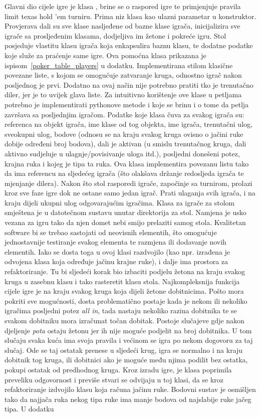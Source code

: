 Glavni dio cijele igre je klasa , brine se o raspored igre te primjenjuje pravila limit texas hold 'em turniru. Prima niz klasa kao ulazni parametar u konstruktor. Provjerava dali su sve klase nasljeđene od bazne klase igrača, inicijalizira sve igrače sa prosljeđenim klasama, dodjeljiva im žetone i pokreće igru. Stol posjeduje vlastitu klasu igrača koja enkapsulira baznu klasu, te dodatne podatke koje služe za praćenje same igre. Ova pomoćna klasa prikazana je ispisom~\ref{poker_table_players} u dodatku. Implementirana stilom klasične povezane liste, s kojom se omogućuje zatvaranje kruga, odnostno igrač nakon posljednog je prvi. Dodatno na ovaj način nije potrebno pratiti tko je trenutačno diler, jer je to uvijek glava liste. Za intuitivno korištenje ove klase u petljama potrebno je implementirati pythonove metode  i  koje se brinu i o tome da petlja završava sa posljednjim igračom. Podatke koje klasa čuva za svakog igrača su: referenca na objekt igrača, ime klase od tog objekta, ime igrača, trenutačni ulog, sveokupni ulog, bodove (odnosu se na kraju svakog kruga ovisno o jačini ruke dobije određeni broj bodova), dali je aktivan (u smislu trenutačnog kruga, dali aktivno sudjeluje u ulagnje/povisivanje uloga itd.), posljedni donešeni potez, krajna ruka i kojeg je tipa ta ruka. Ova klasa implementira povezanu listu tako da ima referencu na sljedećeg igrača (što olakšava držanje redosljeda igrača te mjenjanje dilera). Nakon što stol rasporedi igrače, započinje sa turnirom, prolazi kroz sve faze igre dok ne ostane samo jedan igrač. Prati ulaganja svih igrača, i na kraju dijeli ukupni ulog odgovarajućim igračima. Klasa za igrače za stolom smještena je u datotečnom sustavu unutar direktorija za stol. Namjena je usko vezana za igru tako da njen domet nebi smijo prelaziti samog stola. Kvalitetan software bi se trebao sastojati od neovisnih elementih, što omogućuje jednostavnije testiranje svakog elementa te razmjena ili dodavanje novih elementih. Iako se dosta toga u ovoj klasi razdvojilo (kao npr. izrađena je odvojena klasa koja određuje jačinu krajne ruke), i dalje ima prostora za refaktoriranje. Tu bi sljedeći korak bio izbaciti podjelu žetona na kraju svakog kruga u zasebnu klasu i tako rasteretit klasu stola. Najkompleksnija funkcija cijele igre je na kraju svakog kruga koja dijeli žetone dobitnicima. Pošto mora pokriti sve mogućnosti, dosta problematično postaje kada je nekom ili nekoliko igračima posljedni potez \emph{all in}, tada nastaju nekoliko razina dobitnika te se svakom dobitniku mora izračunat točan dobitak. Postoje slučajeve gdje nakon djeljenje \emph{pota} ostaju žetonu jer ih nije moguće podjelit na broj dobitnika. U tom slučaju svaka kuća ima svoja pravila i većinom se igra po nekom dogovoru za taj slučaj. Ode se taj ostatak prenese u sljedeći krug, igra se normalno i na kraju dobitnik tog kruga, ili dobitnici ako je moguće među njima podilit bez ostatka, pokupi ostatak od predhodnog kruga. Kroz izradu igre, je klasa  poprimila preveliku odgovornost i previše stvari se odvijaju u toj klasi, da se kroz refaktoriranje izdvojilo klasu koja računa jačinu ruke. Bodovni sustav je osmišljen tako da najjača ruka nekog tipa ruke ima manje bodova od najslabije ruke jačeg tipa. U dodatku 